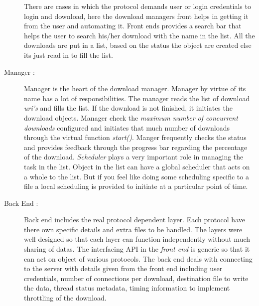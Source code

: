 \documentclass[pdftex,12pt,a4paper,pdfencoding=unicode]{article}
\begin{document}
\begin{onehalfspace}
\begin{description}
        There are cases in which the protocol demands user or login credentials to login and download, here the download managers front
        helps in getting it from the user and automating it. Front ends provides a search bar that helps the user to search his/her
        download with the name in the list. All the downloads are put in a list, based on the status the object are created else its
        just read in to fill the list.

      \item[Manager :] Manager is the heart of the download manager. Manager by virtue of its name has a lot of responsibilities. The
        manager reads the list of download \emph{uri's} and fills the list. If the download is not finished, it initiates the download
        objects. Manager check the \emph{maximum number of concurrent downloads} configured and initiates that much number of downloads
        through the virtual  function \emph{start()}. Manger frequently checks the status and provides feedback through the progress bar
        regarding the percentage of the download. \emph{Scheduler} plays a very important role in managing the task in the list. Object
        in the list can have a global scheduler that acts on a whole to the list. But if you feel like doing some scheduling specific
        to a file a local scheduling is provided to initiate at a particular point of time.

      \item[Back End :] Back end includes the real protocol dependent layer. Each protocol have there own specific details and extra
        files to be handled. The layers were well designed so that each layer can function independently without much sharing of datas.
        The interfacing API in the \emph{front end} is generic so that it can act on object of various protocols. The back end deals with
        connecting to the server with details given from the front end including user credentials, number of connections per download,
        destination file to write the data, thread status metadata, timing information to implement throttling of the download.
      \end{description}


\end{onehalfspace}
\end{document}
